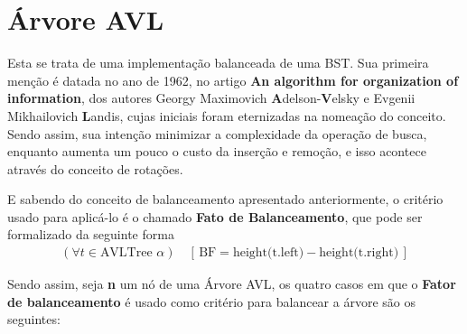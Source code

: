 \section{Árvore AVL}
\label{sec:avl}

Esta se trata de uma implementação balanceada de uma BST. Sua primeira menção é datada no ano de 1962, no artigo \textbf{An algorithm for organization of information}, dos autores Georgy Maximovich \textbf{A}delson-\textbf{V}elsky e Evgenii Mikhailovich \textbf{L}andis, cujas iniciais foram eternizadas na nomeação do conceito. Sendo assim, sua intenção minimizar a complexidade da operação de busca, enquanto aumenta um pouco o custo da inserção e remoção, e isso acontece através do conceito de rotações.

E sabendo do conceito de balanceamento apresentado anteriormente, o critério usado para aplicá-lo é o chamado \textbf{Fato de Balanceamento}, que pode ser formalizado da seguinte forma
\begin{align*}
   (\forall t \in \text{AVLTree } \alpha) \quad 
   \left[ \, \text{BF} = \text{height(t.left)} - \text{height(t.right)} \, \right]
\end{align*}

Sendo assim, seja \textbf{n} um nó de uma Árvore AVL, os quatro casos em que o \textbf{Fator de balanceamento} é usado como critério para balancear a árvore são os seguintes:

